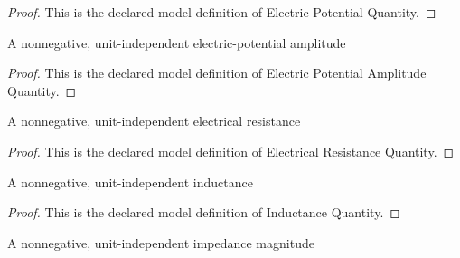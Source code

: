 \begin{proof}
  This is the declared model definition of Electric Potential Quantity.
\end{proof}
\begin{definition}
  \label{def:physics:phyx-mini-0888:phyxminiproblems-problemphyxmini0888-electricpotentialamplitudequantity}
  A nonnegative, unit-independent electric-potential amplitude
\end{definition}
\begin{proof}
  This is the declared model definition of Electric Potential Amplitude Quantity.
\end{proof}
\begin{definition}
  \label{def:physics:phyx-mini-0888:phyxminiproblems-problemphyxmini0888-electricalresistancequantity}
  A nonnegative, unit-independent electrical resistance
\end{definition}
\begin{proof}
  This is the declared model definition of Electrical Resistance Quantity.
\end{proof}
\begin{definition}
  \label{def:physics:phyx-mini-0888:phyxminiproblems-problemphyxmini0888-inductancequantity}
  A nonnegative, unit-independent inductance
\end{definition}
\begin{proof}
  This is the declared model definition of Inductance Quantity.
\end{proof}
\begin{definition}
  \label{def:physics:phyx-mini-0888:phyxminiproblems-problemphyxmini0888-electricalimpedancemagnitudequantity}
  A nonnegative, unit-independent impedance magnitude
\end{definition}
